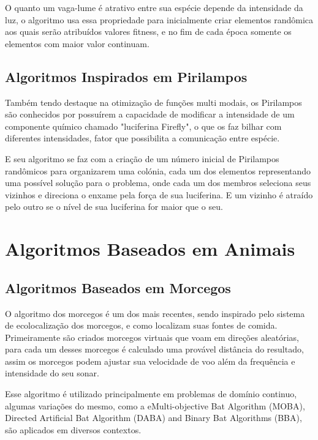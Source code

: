 \documentclass[letterpaper, 10 pt, conference]{ieeeconf}  %
\begin{document}
O quanto um vaga-lume é atrativo entre sua espécie depende da intensidade da luz, o algoritmo usa essa propriedade para inicialmente criar elementos randômica aos quais serão atribuídos valores fitness, e no fim de cada época somente os elementos com maior valor continuam.
\subsection{Algoritmos Inspirados em Pirilampos}

Também tendo destaque na otimização de funções multi modais, os Pirilampos são conhecidos por possuírem a capacidade de modificar a intensidade de um componente químico chamado "luciferina Firefly", o que os faz bilhar com diferentes intensidades, fator que possibilita a comunicação entre espécie.

E seu algoritmo se faz com a criação de um número inicial de Pirilampos randômicos para organizarem uma colónia, cada um dos elementos representando uma possível solução para o problema, onde cada um dos membros seleciona seus vizinhos e direciona o enxame pela força de sua luciferina. E um vizinho é atraído pelo outro se o nível de sua luciferina for maior que o seu.

\section{Algoritmos Baseados em Animais}

\subsection{Algoritmos Baseados em Morcegos}

O algoritmo dos morcegos é um dos mais recentes, sendo inspirado pelo sistema de ecolocalização dos morcegos, e como localizam suas fontes de comida. Primeiramente são criados morcegos virtuais que voam em direções aleatórias, para cada um desses morcegos é calculado uma provável distância do resultado, assim os morcegos podem ajustar sua velocidade de voo além da frequência e intensidade do seu sonar.

Esse algoritmo é utilizado principalmente em problemas de domínio continuo, algumas variações do mesmo, como a eMulti-objective Bat Algorithm (MOBA), Directed Artificial Bat Algorithm (DABA) and Binary Bat Algorithms (BBA), são aplicados em diversos contextos.
\end{document}
